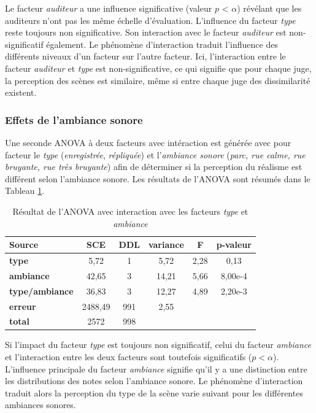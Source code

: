 Le facteur \textit{auditeur} a une influence significative (valeur $p$ < $\alpha$) révélant que les auditeurs n'ont pas les même échelle d'évaluation. L'influence du facteur \textit{type} reste toujours non significative. Son interaction avec le facteur \textit{auditeur} est non-significatif également.
Le phénomène d'interaction traduit l'influence des différents niveaux d'un facteur sur l'autre facteur. Ici, l'interaction entre le facteur \textit{auditeur} et \textit{type} est non-significative, ce qui signifie que pour chaque juge, la perception des scènes est similaire, même si entre chaque juge des dissimilarité existent.

\subsubsection{Effets de l'ambiance sonore}

Une seconde ANOVA à deux facteurs avec intéraction est générée avec pour facteur le \textit{type} (\textit{enregistrée}, \textit{répliquée}) et l'\textit{ambiance sonore} (\textit{parc, rue calme, rue bruyante, rue très bruyante}) afin de déterminer si la perception du réalisme est différent selon l'ambiance sonore. Les résultats de l'ANOVA sont résumés dans le Tableau \ref{tab:anova_ambiance}.

\begin{table}[ht]
\centering
\begin{tabular}{lccccc}
\hline
\textbf{Source}     & \textbf{SCE} & \textbf{DDL} & \textbf{variance} & \textbf{F} & \textbf{p-valeur} \\
\hline
\textbf{type} & 5,72 & 1 & 5,72 & 2,28 & 0,13 \\
\hline
\textbf{ambiance} & 42,65 & 3 & 14,21 & 5,66 & 8,00e-4 \\
\hline
\textbf{type/ambiance} & 36,83 & 3 & 12,27 & 4,89 & 2,20e-3 \\
\hline
\textbf{erreur}      & 2488,49 & 991 & 2,55 & &  \\
\hline
\textbf{total}      & 2572 & 998 & & & \\
\hline
\end{tabular}
\caption{Résultat de l'ANOVA avec interaction avec les facteurs \textit{type} et \textit{ambiance}}
\label{tab:anova_ambiance}
\end{table}


Si l'impact du facteur \textit{type} est toujours non significatif, celui du facteur \textit{ambiance} et l'interaction entre les deux facteurs sont toutefois significatifs ($p < \alpha$). L'influence principale du facteur \textit{ambiance} signifie qu'il y a une distinction entre les distributions des notes selon l'ambiance sonore. Le phénomène d'interaction traduit alors la perception du type de la scène varie suivant pour les différentes ambiances sonores.

